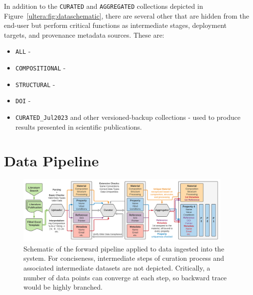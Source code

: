 In addition to the \texttt{CURATED} and \texttt{AGGREGATED} collections depicted in Figure~\ref{ultera:fig:dataschematic}, there are several other that are hidden from the end-user but perform critical functions as intermediate stages, deployment targets, and provenance metadata sources. These are:
\begin{itemize}
    \item \texttt{ALL} - 
    \item \texttt{COMPOSITIONAL} - 
    \item \texttt{STRUCTURAL} - 
    \item \texttt{DOI} - 
    \item \texttt{CURATED\_Jul2023} and other versioned-backup collections - used to produce results presented in scientific publications.
\end{itemize}



\section{Data Pipeline} \label{ultera:sec:pipeline}

\todo

\begin{figure}[H]
    \centering
    \includegraphics[width=0.95\textwidth]{ultera/ULTERA Data Detail.png}
    \caption{Schematic of the forward pipeline applied to data ingested into the system. For conciseness, intermediate steps of curation process and associated intermediate datasets are not depicted. Critically, a number of data points can converge at each step, so backward trace would be highly branched.}
    \label{ultera:fig:datapipeline}
\end{figure}


